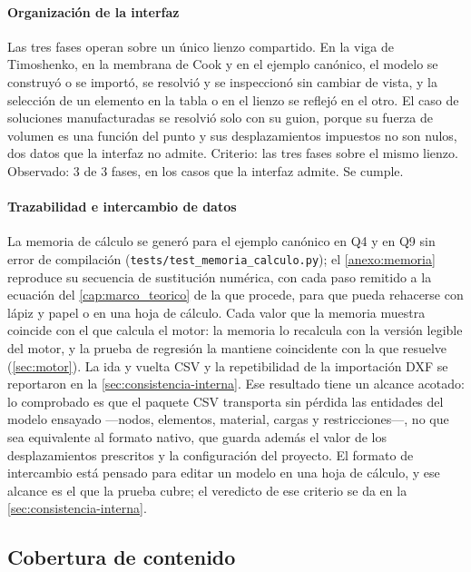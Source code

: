 \paragraph{Organización de la interfaz} Las tres fases operan sobre un único lienzo compartido. En la viga de Timoshenko, en la membrana de Cook y en el ejemplo canónico, el modelo se construyó o se importó, se resolvió y se inspeccionó sin cambiar de vista, y la selección de un elemento en la tabla o en el lienzo se reflejó en el otro. El caso de soluciones manufacturadas se resolvió solo con su guion, porque su fuerza de volumen es una función del punto y sus desplazamientos impuestos no son nulos, dos datos que la interfaz no admite. Criterio: las tres fases sobre el mismo lienzo. Observado: 3 de 3 fases, en los casos que la interfaz admite. Se cumple.

\paragraph{Trazabilidad e intercambio de datos} La memoria de cálculo se generó para el ejemplo canónico en Q4 y en Q9 sin error de compilación (\mbox{\texttt{tests/test\_memoria\_calculo.py}}); el \autoref{anexo:memoria} reproduce su secuencia de sustitución numérica, con cada paso remitido a la ecuación del \autoref{cap:marco_teorico} de la que procede, para que pueda rehacerse con lápiz y papel o en una hoja de cálculo. Cada valor que la memoria muestra coincide con el que calcula el motor: la memoria lo recalcula con la versión legible del motor, y la prueba de regresión la mantiene coincidente con la que resuelve (\autoref{sec:motor}). La ida y vuelta CSV y la repetibilidad de la importación DXF se reportaron en la \autoref{sec:consistencia-interna}. Ese resultado tiene un alcance acotado: lo comprobado es que el paquete CSV transporta sin pérdida las entidades del modelo ensayado —nodos, elementos, material, cargas y restricciones—, no que sea equivalente al formato nativo, que guarda además el valor de los desplazamientos prescritos y la configuración del proyecto. El formato de intercambio está pensado para editar un modelo en una hoja de cálculo, y ese alcance es el que la prueba cubre; el veredicto de ese criterio se da en la \autoref{sec:consistencia-interna}.

\subsection{Cobertura de contenido}
\label{sec:contenido-didactico}

